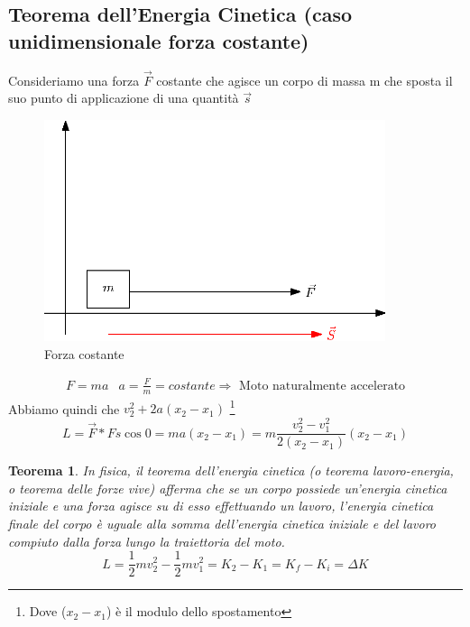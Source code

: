 \documentclass{book}
\newtheorem{teo}{Teorema}
\begin{document}
\subsection{Teorema dell’Energia Cinetica (caso unidimensionale forza costante)}
Consideriamo una forza $\vec{F}$ costante che agisce un corpo di massa m che sposta il suo punto di
applicazione di una quantità $\vec{s}$
\begin{figure}[th]
    \centering
    \includegraphics[width=10cm]{img/finiti/forza_costante.eps}
    \caption{Forza costante}
\end{figure}
\begin{equation}
  \begin{matrix}
    F=ma & a=\frac{F}{m}=costante \Rightarrow \text{ Moto naturalmente accelerato}
  \end{matrix}
\end{equation}
Abbiamo quindi che $v_2^2+2a(x_2-x_1)$ \footnote{Dove ($x_2-x_1$) è il modulo dello spostamento}
\begin{equation}
  L=\vec{F} * Fs \cos 0 = ma (x_2-x_1)=m\frac{v_2^2-v_1^2}{2(x_2-x_1)}(x_2-x_1)
\end{equation}
\begin{teo}
  In fisica, il teorema dell'energia cinetica (o teorema lavoro-energia, o
  teorema delle forze vive) afferma che se un corpo possiede un'energia cinetica iniziale e
  una forza agisce su di esso effettuando un lavoro, l'energia cinetica finale del corpo è
  uguale alla somma dell'energia cinetica iniziale e del lavoro compiuto dalla forza lungo
  la traiettoria del moto.
  \begin{equation}
    L=\frac{1}{2} m v_2^2-\frac{1}{2} m v_1^2=K_2-K_1=K_f-K_i=\Delta K
  \end{equation}
\end{teo}
\end{document}
